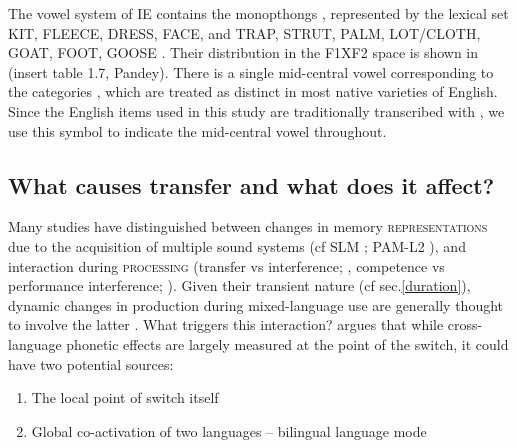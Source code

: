 \documentclass[11pt]{article}
\newcommand{\nt}[1]{\textipa{[#1]}} %
\begin{document}
The vowel system of IE contains the monopthongs \nt{I, i, E, e, \ae, @/2, a:, O, o, U, u}, represented by the lexical set KIT, FLEECE, DRESS, FACE, and TRAP, STRUT, PALM, LOT/CLOTH, GOAT, FOOT, GOOSE \cite{wells1982accents, masica1972sound}. Their distribution in the F1XF2 space is shown in (insert table 1.7, Pandey). There is a single mid-central vowel corresponding to the categories \nt{2,@,3:}, which are treated as distinct in most native varieties of English. Since the English items used in this study are traditionally transcribed with \nt{2}, we use this symbol to indicate the mid-central vowel throughout. %




\subsection{What causes transfer and what does it affect?}

Many studies have distinguished between changes in memory \textsc{representations} due to the acquisition of multiple sound systems (cf SLM ; PAM-L2 ), and interaction during \textsc{processing} (transfer vs interference; , competence vs performance interference; ). 
Given their transient nature (cf sec.\ref{duration}), dynamic changes in production during mixed-language use are generally thought to involve the latter \cite{elias2017effects,simonet2014phonetic}. What triggers this interaction?  argues that while cross-language phonetic effects are largely measured at the point of the switch, it could have two potential sources:
\begin{enumerate}
	\item The local point of switch itself
	\item Global co-activation of two languages -- bilingual language mode \cite{grosjean1998studying} 
\end{enumerate}
\end{document}
